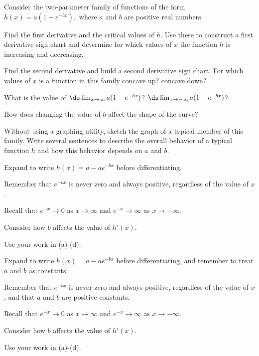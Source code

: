 \begin{activity} \label{A:3.2.2} 
 Consider the two-parameter family of functions of the form $h(x) = a(1-e^{-bx}),$ where $a$ and $b$ are positive real numbers.
	 \ba
		\item Find the first derivative and the critical values of $h$.  Use these to construct a first derivative sign chart and determine for which values of $x$ the function $h$ is increasing and decreasing. 
	 	\item Find the second derivative and build a second derivative sign chart.  For which values of $x$ is a function in this family concave up?  concave down?
		\item What is the value of $\ds \lim_{x \to \infty} a(1-e^{-bx})$? $\ds \lim_{x \to -\infty} a(1-e^{-bx})$?
		\item How does changing the value of $b$ affect the shape of the curve?
	  	\item Without using a graphing utility, sketch the graph of a typical member of this family. Write several sentences to describe the overall behavior of a typical function $h$ and how this behavior depends on $a$ and $b$.
	 \ea
\end{activity}
\begin{smallhint}
	 \ba
		\item Expand to write $h(x) = a - ae^{-bx}$ before differentiating.
	 	\item Remember that $e^{-bx}$ is never zero and always positive, regardless of the value of $x$.
		\item Recall that $e^{-x} \to 0$ as $x \to \infty$ and $e^{-x} \to \infty$ as $x \to -\infty$.
		\item Consider how $b$ affects the value of $h'(x)$.
	  	\item Use your work in (a)-(d).
	 \ea
\end{smallhint}
\begin{bighint}
	 \ba
		\item Expand to write $h(x) = a - ae^{-bx}$ before differentiating, and remember to treat $a$ and $b$ as constants.
	 	\item Remember that $e^{-bx}$ is never zero and always positive, regardless of the value of $x$, and that $a$ and $b$ are positive constants.
		\item Recall that $e^{-x} \to 0$ as $x \to \infty$ and $e^{-x} \to \infty$ as $x \to -\infty$.
		\item Consider how $b$ affects the value of $h'(x)$.
	  	\item Use your work in (a)-(d).
	 \ea
\end{bighint}
